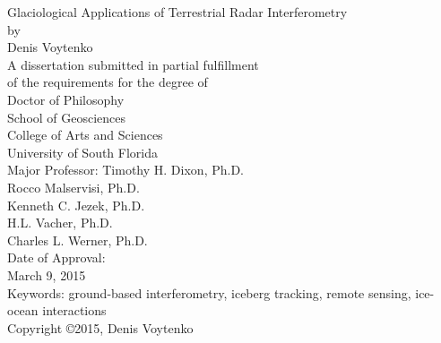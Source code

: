\begin{titlepage}
\begin{center}
\singlespacing
{ \vspace*{\baselineskip} }
{ \vspace*{\baselineskip} }
{ \vspace*{\baselineskip} }
{ \vspace*{\baselineskip} }
Glaciological Applications of Terrestrial Radar Interferometry\\
{ \vspace*{\baselineskip} }
{ \vspace*{\baselineskip} }
{ \vspace*{\baselineskip} }
by\\
{ \vspace*{\baselineskip} }
{ \vspace*{\baselineskip} }
{ \vspace*{\baselineskip} }
Denis Voytenko\\
{ \vspace*{\baselineskip} }
{ \vspace*{\baselineskip} }
{ \vspace*{\baselineskip} }
{ \vspace*{\baselineskip} }
A dissertation submitted in partial fulfillment\\
of the requirements for the degree of\\
Doctor of Philosophy\\
School of Geosciences\\
College of Arts and Sciences\\
University of South Florida\\
{ \vspace*{\baselineskip} }
{ \vspace*{\baselineskip} }
{ \vspace*{\baselineskip} }
Major Professor: Timothy H. Dixon, Ph.D.\\
Rocco Malservisi, Ph.D.\\
Kenneth C. Jezek, Ph.D.\\
H.L. Vacher, Ph.D.\\
Charles L. Werner, Ph.D.\\
{ \vspace*{\baselineskip} }
{ \vspace*{\baselineskip} }
Date of Approval:\\
March 9, 2015\\
{ \vspace*{\baselineskip} }
{ \vspace*{\baselineskip} }
{ \vspace*{\baselineskip} }
Keywords: ground-based interferometry, iceberg tracking, remote sensing, ice-ocean interactions\\
{ \vspace*{\baselineskip} }
Copyright \copyright\hspace{1mm}2015, Denis Voytenko\\
\end{center}
\end{titlepage}